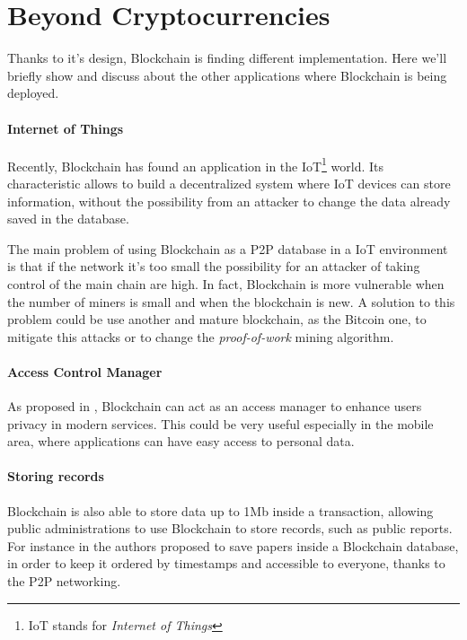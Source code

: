 \section{Beyond Cryptocurrencies}

Thanks to it's design, Blockchain is finding different implementation. Here
we'll briefly show and discuss about the other applications where Blockchain is
being deployed.

\paragraph*{Internet of Things}

Recently, Blockchain has found an application in the IoT\footnote{IoT stands
for \textit{Internet of Things}} world\cite{politecnico16}. Its characteristic
allows to build a decentralized system where IoT devices can store information,
without the possibility from an attacker to change the data already saved in
the database\cite{politecnico16}.

The main problem of using Blockchain as a P2P database in a IoT environment is
that if the network it's too small the possibility for an attacker of taking
control of the main chain are high. In fact, Blockchain is more vulnerable when
the number of miners is small and when the blockchain is new. A solution to
this problem could be use another and mature blockchain, as the Bitcoin one, to
mitigate this attacks or to change the \textit{proof-of-work} mining algorithm.

\paragraph*{Access Control Manager}

As proposed in \cite{dp15}, Blockchain can act as an access manager to enhance
users privacy in modern services. This could be very useful especially in the
mobile area, where applications can have easy access to personal data.

\paragraph*{Storing records}

Blockchain is also able to store data up to 1Mb \cite{ectel16} inside a
transaction, allowing public administrations to use Blockchain to store
records, such as public reports. For instance in \cite{ectel16} the authors
proposed to save papers inside a Blockchain database, in order to keep it
ordered by timestamps and accessible to everyone, thanks to the P2P networking.
